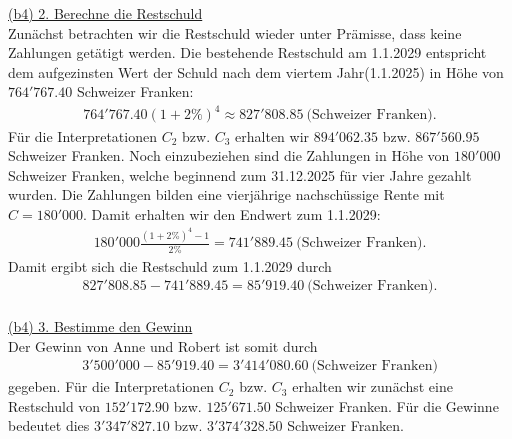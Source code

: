 \underline{(b4) 2. Berechne die Restschuld}\\
Zunächst betrachten wir die Restschuld wieder unter Prämisse, dass keine Zahlungen getätigt werden. Die bestehende Restschuld am 1.1.2029 entspricht dem aufgezinsten Wert der Schuld nach dem viertem Jahr(1.1.2025) in Höhe von $764'767.40$ Schweizer Franken:
\begin{align*}
	764'767.40(1+ 2 \%)^4
	\approx
	827'808.85\ \textrm{(Schweizer Franken)}.
\end{align*} 
Für die Interpretationen $C_2$ bzw. $C_3$ erhalten wir $894'062.35$ bzw. $867'560.95$ Schweizer Franken. 
Noch einzubeziehen sind die Zahlungen in Höhe von $180'000$ Schweizer Franken, welche beginnend zum 31.12.2025 für vier Jahre gezahlt wurden.
Die Zahlungen bilden eine vierjährige nachschüssige Rente mit $C = 180' 000$. Damit erhalten wir den Endwert zum 1.1.2029:
\begin{align*}
	180' 000
	\frac{(1+ 2 \%)^4 -1 }{2 \%}
	 = 
	 741' 889.45 \ \textrm{(Schweizer Franken)}.
\end{align*}
Damit ergibt sich die Restschuld zum 1.1.2029 durch
\begin{align*}
	827' 808.85 
	-
	741 '889.45
	=
	85'919.40  \ \textrm{(Schweizer Franken)}.
\end{align*}
\ \\
\underline{(b4) 3. Bestimme den Gewinn}\\
Der Gewinn von Anne und Robert ist somit durch
\begin{align*}
	3'500 '000 - 85'919.40 = 3'414'080.60 \ \textrm{(Schweizer Franken)}
\end{align*}
gegeben.
Für die Interpretationen $C_2$ bzw. $C_3$ erhalten wir zunächst eine Restschuld von $152'172.90$ bzw. $125'671.50$ Schweizer Franken. Für die Gewinne bedeutet dies $3'347'827.10$ bzw. $3'374'328.50$ Schweizer Franken.

\newpage
